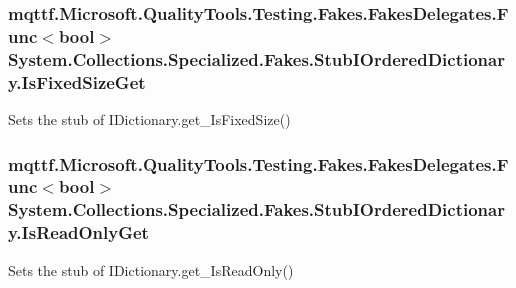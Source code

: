\hypertarget{class_system_1_1_collections_1_1_specialized_1_1_fakes_1_1_stub_i_ordered_dictionary_a32d55c0a58d43dc0085b50fd16ea68b6}{
\subsubsection[{Is\-Fixed\-Size\-Get}]{\setlength{\rightskip}{0pt plus 5cm}mqttf.\-Microsoft.\-Quality\-Tools.\-Testing.\-Fakes.\-Fakes\-Delegates.\-Func$<$bool$>$ System.\-Collections.\-Specialized.\-Fakes.\-Stub\-I\-Ordered\-Dictionary.\-Is\-Fixed\-Size\-Get}}\label{class_system_1_1_collections_1_1_specialized_1_1_fakes_1_1_stub_i_ordered_dictionary_a32d55c0a58d43dc0085b50fd16ea68b6}


Sets the stub of I\-Dictionary.\-get\-\_\-\-Is\-Fixed\-Size()

\hypertarget{class_system_1_1_collections_1_1_specialized_1_1_fakes_1_1_stub_i_ordered_dictionary_a765c69cec24408e0b940af41e18d6081}{
\subsubsection[{Is\-Read\-Only\-Get}]{\setlength{\rightskip}{0pt plus 5cm}mqttf.\-Microsoft.\-Quality\-Tools.\-Testing.\-Fakes.\-Fakes\-Delegates.\-Func$<$bool$>$ System.\-Collections.\-Specialized.\-Fakes.\-Stub\-I\-Ordered\-Dictionary.\-Is\-Read\-Only\-Get}}\label{class_system_1_1_collections_1_1_specialized_1_1_fakes_1_1_stub_i_ordered_dictionary_a765c69cec24408e0b940af41e18d6081}


Sets the stub of I\-Dictionary.\-get\-\_\-\-Is\-Read\-Only()

